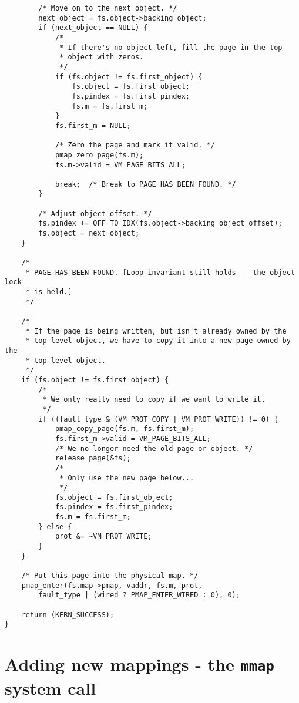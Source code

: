 \documentclass[shortabstract, english]{iithesis}
\newenvironment{code}{}{}
\begin{document}
\begin{code}
\begin{verbatim}
        /* Move on to the next object. */
        next_object = fs.object->backing_object;
        if (next_object == NULL) {
            /*
             * If there's no object left, fill the page in the top
             * object with zeros.
             */
            if (fs.object != fs.first_object) {
                fs.object = fs.first_object;
                fs.pindex = fs.first_pindex;
                fs.m = fs.first_m;
            }
            fs.first_m = NULL;

            /* Zero the page and mark it valid. */
            pmap_zero_page(fs.m);
            fs.m->valid = VM_PAGE_BITS_ALL;

            break;  /* Break to PAGE HAS BEEN FOUND. */
        }

        /* Adjust object offset. */
        fs.pindex += OFF_TO_IDX(fs.object->backing_object_offset);
        fs.object = next_object;
    }

    /*
     * PAGE HAS BEEN FOUND. [Loop invariant still holds -- the object lock
     * is held.]
     */

    /*
     * If the page is being written, but isn't already owned by the
     * top-level object, we have to copy it into a new page owned by the
     * top-level object.
     */
    if (fs.object != fs.first_object) {
        /*
         * We only really need to copy if we want to write it.
         */
        if ((fault_type & (VM_PROT_COPY | VM_PROT_WRITE)) != 0) {
            pmap_copy_page(fs.m, fs.first_m);
            fs.first_m->valid = VM_PAGE_BITS_ALL;
            /* We no longer need the old page or object. */
            release_page(&fs);
            /*
             * Only use the new page below...
             */
            fs.object = fs.first_object;
            fs.pindex = fs.first_pindex;
            fs.m = fs.first_m;
        } else {
            prot &= ~VM_PROT_WRITE;
        }
    }

    /* Put this page into the physical map. */
    pmap_enter(fs.map->pmap, vaddr, fs.m, prot,
        fault_type | (wired ? PMAP_ENTER_WIRED : 0), 0);

    return (KERN_SUCCESS);
}
\end{verbatim}
\end{code}

\section{Adding new mappings - the \texttt{mmap} system call}
\end{document}
